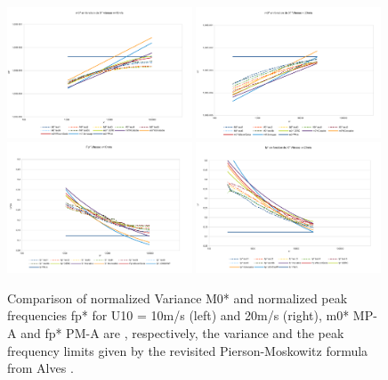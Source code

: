 \begin{figure}[H]
  \centering
  \includegraphics[width=0.49\textwidth]{M0v10id.pdf}
  \includegraphics[width=0.49\textwidth]{M0v20id.pdf}\\
  \includegraphics[width=0.49\textwidth]{fpv10id.pdf}
  \includegraphics[width=0.49\textwidth]{fpv20id.pdf}\\
        \caption{Comparison of normalized Variance M0* and normalized peak
          frequencies fp* for U10 = 10m/s (left) and 20m/s (right), m0* MP-A
          and fp* PM-A are , respectively, the variance and the peak frequency
          limits given by the revisited Pierson-Moskowitz formula from Alves
          \cite{Alves2003}.}
\label{variancefet}
\end{figure}

